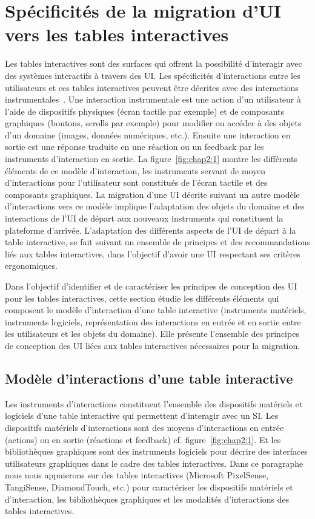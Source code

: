 \section{Spécificités de la migration d'UI vers les tables interactives}
\label{sec:chap2:4}
Les tables interactives sont des surfaces qui offrent la possibilité d'interagir avec des systèmes interactifs à travers des UI. Les spécificités d'interactions entre les utilisateurs et ces tables interactives peuvent être décrites avec des interactions instrumentales~\cite{Beaudouin-Lafon2000}. Une interaction instrumentale est une action d'un utilisateur à l'aide de dispositifs physiques (écran tactile par exemple) et de composants graphiques (boutons, scrolls par exemple) pour modifier ou accéder à des objets d'un domaine (images, données numériques, etc.). Ensuite une interaction en sortie est une réponse traduite en une réaction ou un feedback par les instruments d'interaction en sortie. La figure~\ref{fig:chap2:1} montre les différents éléments de ce modèle d'interaction, les instruments servant de moyen d'interactions  pour l'utilisateur sont constitués de l'écran tactile et des composants graphiques. La migration d'une UI décrite suivant un autre modèle d'interactions vers ce modèle implique l'adaptation des objets du domaine et des interactions de l'UI de départ aux nouveaux instruments qui constituent la plateforme d'arrivée. L'adaptation des différents aspects de l'UI de départ à la table interactive, se fait suivant un ensemble de principes et des recommandations liés aux tables interactives, dans l'objectif d'avoir une UI respectant ses critères ergonomiques.


Dans l'objectif d'identifier et de caractériser les principes de conception des UI pour les tables interactives, cette section étudie les différents éléments qui composent le modèle d'interaction d'une table interactive (instruments matériels, instruments logiciels, représentation des interactions  en entrée et en sortie entre les utilisateurs et les objets du domaine). Elle  présente l'ensemble des principes de conception des UI liées aux tables interactives nécessaires pour la migration. 
	
\subsection{Modèle d'interactions d'une table interactive}
Les instruments d'interactions constituent l'ensemble des dispositifs matériels et logiciels d'une table interactive qui permettent d'interagir avec un SI. Les dispositifs matériels d'interactions sont des moyens d'interactions en entrée (actions) ou en sortie (réactions et feedback) cf. figure~\ref{fig:chap2:1}. Et les bibliothèques graphiques sont des instruments logiciels pour décrire des interfaces utilisateurs graphiques dans le cadre des tables interactives. Dans ce paragraphe nous nous appuierons sur des tables interactives (Microsoft PixelSense, TangiSense, DiamondTouch, etc.) pour caractériser les dispositifs matériels et d'interaction, les bibliothèques graphiques et les modalités d'interactions des tables interactives. 

